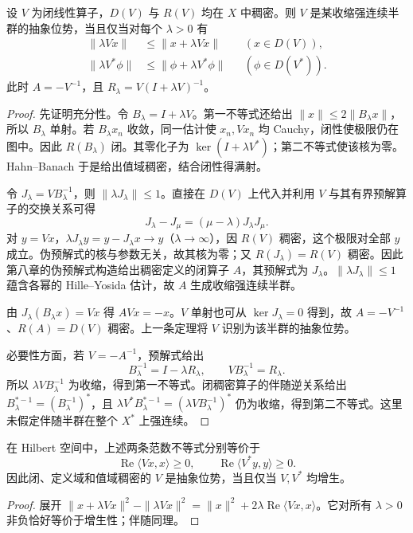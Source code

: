 \begin{theorem}[位势的双侧范数刻画]\label{thm:y13-potential-characterization}
设 $V$ 为闭线性算子，$D(V)$ 与 $R(V)$ 均在 $X$ 中稠密。则 $V$ 是某收缩强连续半群的抽象位势，当且仅当对每个 $\lambda>0$ 有
\begin{align}
 \|\lambda Vx\|&\le\|x+\lambda Vx\|&& (x\in D(V)),\label{eq:y13-potential-primal}\\
 \|\lambda V^*\phi\|&\le\|\phi+\lambda V^*\phi\|&& (\phi\in D(V^*)).\label{eq:y13-potential-dual}
\end{align}
此时 $A=-V^{-1}$，且 $R_\lambda=V(I+\lambda V)^{-1}$。
\end{theorem}
\begin{proof}
先证明充分性。令 $B_\lambda=I+\lambda V$。第一不等式还给出 $\|x\|\le2\|B_\lambda x\|$，所以 $B_\lambda$ 单射。若 $B_\lambda x_n$ 收敛，同一估计使 $x_n,Vx_n$ 均 Cauchy，闭性使极限仍在图中。因此 $R(B_\lambda)$ 闭。其零化子为 $\ker(I+\lambda V^*)$；第二不等式使该核为零。Hahn--Banach 于是给出值域稠密，结合闭性得满射。

令 $J_\lambda=VB_\lambda^{-1}$，则 $\|\lambda J_\lambda\|\le1$。直接在 $D(V)$ 上代入并利用 $V$ 与其有界预解算子的交换关系可得
\[
 J_\lambda-J_\mu=(\mu-\lambda)J_\lambda J_\mu.
\]
对 $y=Vx$，$\lambda J_\lambda y=y-J_\lambda x\to y$（$\lambda\to\infty$），因 $R(V)$ 稠密，这个极限对全部 $y$ 成立。伪预解式的核与参数无关，故其核为零；又 $R(J_\lambda)=R(V)$ 稠密。因此第八章的伪预解式构造给出稠密定义的闭算子 $A$，其预解式为 $J_\lambda$。$\|\lambda J_\lambda\|\le1$ 蕴含各幂的 Hille--Yosida 估计，故 $A$ 生成收缩强连续半群。

由 $J_\lambda(B_\lambda x)=Vx$ 得 $AVx=-x$。$V$ 单射也可从 $\ker J_\lambda=0$ 得到，故 $A=-V^{-1}$、$R(A)=D(V)$ 稠密。上一条定理将 $V$ 识别为该半群的抽象位势。

必要性方面，若 $V=-A^{-1}$，预解式给出
\[
 B_\lambda^{-1}=I-\lambda R_\lambda,\qquad
 VB_\lambda^{-1}=R_\lambda.
\]
所以 $\lambda VB_\lambda^{-1}$ 为收缩，得到第一不等式。闭稠密算子的伴随逆关系给出 $B_\lambda^{*-1}=(B_\lambda^{-1})^*$，且 $\lambda V^*B_\lambda^{*-1}=(\lambda VB_\lambda^{-1})^*$ 仍为收缩，得到第二不等式。这里未假定伴随半群在整个 $X^*$ 上强连续。
\end{proof}

\begin{corollary}
在 Hilbert 空间中，上述两条范数不等式分别等价于
\[
 \operatorname{Re}\langle Vx,x\rangle\ge0,\qquad
 \operatorname{Re}\langle V^*y,y\rangle\ge0.
\]
因此闭、定义域和值域稠密的 $V$ 是抽象位势，当且仅当 $V,V^*$ 均增生。
\end{corollary}
\begin{proof}
展开 $\|x+\lambda Vx\|^2-\|\lambda Vx\|^2=\|x\|^2+2\lambda\operatorname{Re}\langle Vx,x\rangle$。它对所有 $\lambda>0$ 非负恰好等价于增生性；伴随同理。
\end{proof}

